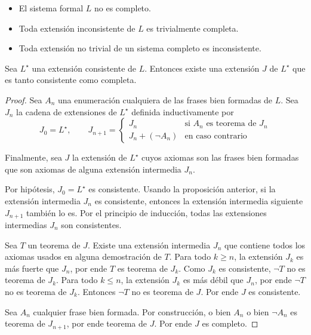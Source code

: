 \begin{remarks}
\leavevmode
\begin{itemize}
    \item El sistema formal $L$ no es completo.
    \item Toda extensión inconsistente de $L$ es trivialmente completa.
    \item Toda extensión no trivial de un sistema completo es inconsistente.
\end{itemize}
\end{remarks}

\begin{proposition}
Sea $L^\star$ una extensión consistente de $L$. Entonces existe una extensión $J$ de $L^\star$ que es tanto consistente como completa.
\end{proposition}

\begin{proof}
Sea $A_n$ una enumeración cualquiera de las frases bien formadas de $L$. Sea $J_n$ la cadena de extensiones de $L^\star$ definida inductivamente por
$$
J_0 = L^\star, \qquad
J_{n+1} =
    \begin{cases}
        J_n              & \text{si } A_n \text{ es teorema de $J_n$} \\
        J_n + (\neg A_n) & \text{en caso contrario}
    \end{cases}
$$

Finalmente, sea $J$ la extensión de $L^\star$ cuyos axiomas son las frases bien formadas que son axiomas de alguna extensión intermedia $J_n$.

Por hipótesis, $J_0 = L^\star$ es consistente. Usando la proposición anterior, si la extensión intermedia $J_n$ es consistente, entonces la extensión intermedia siguiente $J_{n+1}$ también lo es. Por el principio de inducción, todas las extensiones intermedias $J_n$ son consistentes.

Sea $T$ un teorema de $J$. Existe una extensión intermedia $J_n$ que contiene todos los axiomas usados en alguna demostración de $T$. Para todo $k \ge n$, la extensión $J_k$ es más fuerte que $J_n$, por ende $T$ es teorema de $J_k$. Como $J_k$ es consistente, $\neg T$ no es teorema de $J_k$. Para todo $k \le n$, la extensión $J_k$ es más débil que $J_n$, por ende $\neg T$ no es teorema de $J_k$. Entonces $\neg T$ no es teorema de $J$. Por ende $J$ es consistente.

Sea $A_n$ cualquier frase bien formada. Por construcción, o bien $A_n$ o bien $\neg A_n$ es teorema de $J_{n+1}$, por ende teorema de $J$. Por ende $J$ es completo.
\end{proof}


